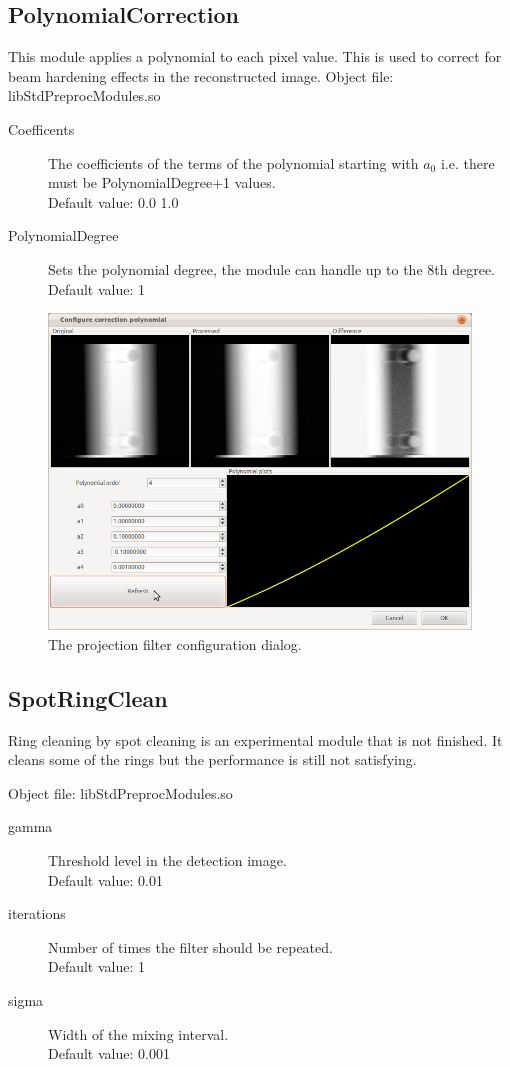 \documentclass[a4paper]{scrreprt}
\begin{document}
\subsection{PolynomialCorrection}
This module applies a polynomial to each pixel value. This is used to correct for beam hardening effects in the reconstructed image.
Object file: libStdPreprocModules.so
\begin{description}
 \item[Coefficents] The coefficients of the terms of the polynomial starting with $a_0$ i.e. there must be PolynomialDegree+1 values.\\ Default value: 0.0 1.0
 \item[PolynomialDegree] Sets the polynomial degree, the module can handle up to the 8th degree. \\Default value: 1
\end{description}
\begin{figure}[ht!]
\centering
\includegraphics[scale=0.5]{figures3/ConfPolyCorr.png}
\caption{The projection filter configuration dialog.}
\end{figure}


\subsection{SpotRingClean}
Ring cleaning by spot cleaning is an experimental module that is not finished. It cleans some of the rings but the performance is still not satisfying.

Object file: libStdPreprocModules.so
\begin{description}
 \item[gamma] Threshold level in the detection image. \\Default value: 0.01
 \item[iterations] Number of times the filter should be repeated. \\Default value: 1
 \item[sigma] Width of the mixing interval. \\ Default value: 0.001
\end{description}
\end{document}
